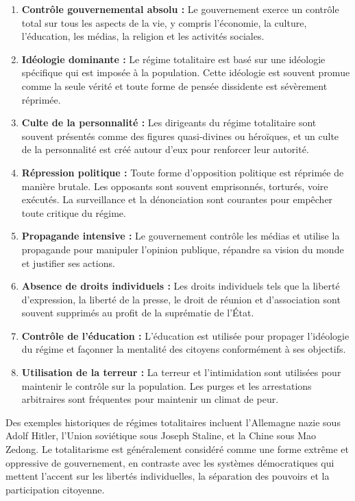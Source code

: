 \documentclass[
  letterpaper,
]{scrbook}
\begin{document}
\begin{enumerate}
\def\labelenumi{\arabic{enumi}.}
\item
  \textbf{Contrôle gouvernemental absolu :} Le gouvernement exerce un
  contrôle total sur tous les aspects de la vie, y compris l'économie,
  la culture, l'éducation, les médias, la religion et les activités
  sociales.
\item
  \textbf{Idéologie dominante :} Le régime totalitaire est basé sur une
  idéologie spécifique qui est imposée à la population. Cette idéologie
  est souvent promue comme la seule vérité et toute forme de pensée
  dissidente est sévèrement réprimée.
\item
  \textbf{Culte de la personnalité :} Les dirigeants du régime
  totalitaire sont souvent présentés comme des figures quasi-divines ou
  héroïques, et un culte de la personnalité est créé autour d'eux pour
  renforcer leur autorité.
\item
  \textbf{Répression politique :} Toute forme d'opposition politique est
  réprimée de manière brutale. Les opposants sont souvent emprisonnés,
  torturés, voire exécutés. La surveillance et la dénonciation sont
  courantes pour empêcher toute critique du régime.
\item
  \textbf{Propagande intensive :} Le gouvernement contrôle les médias et
  utilise la propagande pour manipuler l'opinion publique, répandre sa
  vision du monde et justifier ses actions.
\item
  \textbf{Absence de droits individuels :} Les droits individuels tels
  que la liberté d'expression, la liberté de la presse, le droit de
  réunion et d'association sont souvent supprimés au profit de la
  suprématie de l'État.
\item
  \textbf{Contrôle de l'éducation :} L'éducation est utilisée pour
  propager l'idéologie du régime et façonner la mentalité des citoyens
  conformément à ses objectifs.
\item
  \textbf{Utilisation de la terreur :} La terreur et l'intimidation sont
  utilisées pour maintenir le contrôle sur la population. Les purges et
  les arrestations arbitraires sont fréquentes pour maintenir un climat
  de peur.
\end{enumerate}

Des exemples historiques de régimes totalitaires incluent l'Allemagne
nazie sous Adolf Hitler, l'Union soviétique sous Joseph Staline, et la
Chine sous Mao Zedong. Le totalitarisme est généralement considéré comme
une forme extrême et oppressive de gouvernement, en contraste avec les
systèmes démocratiques qui mettent l'accent sur les libertés
individuelles, la séparation des pouvoirs et la participation citoyenne.
\end{document}
